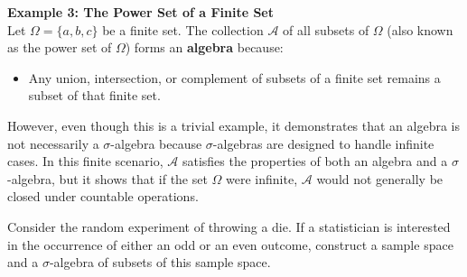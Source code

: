 \textbf{Example 3: The Power Set of a Finite Set} \\

Let $\Omega = \{a, b, c\}$ be a finite set. The collection $\mathcal{A}$ of all subsets of $\Omega$ (also known as the power set of $\Omega$) forms an \textbf{algebra} because:
\begin{itemize}
    \item Any union, intersection, or complement of subsets of a finite set remains a subset of that finite set.
\end{itemize}

However, even though this is a trivial example, it demonstrates that an algebra is not necessarily a $\sigma$-algebra because $\sigma$-algebras are designed to handle infinite cases. In this finite scenario, $\mathcal{A}$ satisfies the properties of both an algebra and a $\sigma$-algebra, but it shows that if the set $\Omega$ were infinite, $\mathcal{A}$ would not generally be closed under countable operations.\\


\begin{exercise}
    Consider the random experiment of throwing a die. If a statistician is interested in the occurrence of either an odd or an even outcome, construct a sample space and a $\sigma$-algebra of subsets of this sample space.
\end{exercise}

